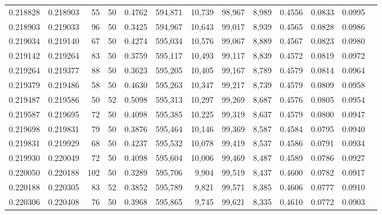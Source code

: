 \begin{tabular}{rrrrrrrrrrrrr}
0.218828 & 0.218903 &    55 &  50 &                                     0.4762 & 594,871 &  10,739 &  98,967 &   8,989 & 0.4556 & 0.0833 & 0.0995 \\
0.218903 & 0.219033 &    96 &  50 &                                     0.3425 & 594,967 &  10,643 &  99,017 &   8,939 & 0.4565 & 0.0828 & 0.0986 \\
0.219034 & 0.219140 &    67 &  50 &                                     0.4274 & 595,034 &  10,576 &  99,067 &   8,889 & 0.4567 & 0.0823 & 0.0980 \\
0.219142 & 0.219264 &    83 &  50 &                                     0.3759 & 595,117 &  10,493 &  99,117 &   8,839 & 0.4572 & 0.0819 & 0.0972 \\
0.219264 & 0.219377 &    88 &  50 &                                     0.3623 & 595,205 &  10,405 &  99,167 &   8,789 & 0.4579 & 0.0814 & 0.0964 \\
0.219379 & 0.219486 &    58 &  50 &                                     0.4630 & 595,263 &  10,347 &  99,217 &   8,739 & 0.4579 & 0.0809 & 0.0958 \\
0.219487 & 0.219586 &    50 &  52 &                                     0.5098 & 595,313 &  10,297 &  99,269 &   8,687 & 0.4576 & 0.0805 & 0.0954 \\
0.219587 & 0.219695 &    72 &  50 &                                     0.4098 & 595,385 &  10,225 &  99,319 &   8,637 & 0.4579 & 0.0800 & 0.0947 \\
0.219698 & 0.219831 &    79 &  50 &                                     0.3876 & 595,464 &  10,146 &  99,369 &   8,587 & 0.4584 & 0.0795 & 0.0940 \\
0.219831 & 0.219929 &    68 &  50 &                                     0.4237 & 595,532 &  10,078 &  99,419 &   8,537 & 0.4586 & 0.0791 & 0.0934 \\
0.219930 & 0.220049 &    72 &  50 &                                     0.4098 & 595,604 &  10,006 &  99,469 &   8,487 & 0.4589 & 0.0786 & 0.0927 \\
0.220050 & 0.220188 &   102 &  50 &                                     0.3289 & 595,706 &   9,904 &  99,519 &   8,437 & 0.4600 & 0.0782 & 0.0917 \\
0.220188 & 0.220305 &    83 &  52 &                                     0.3852 & 595,789 &   9,821 &  99,571 &   8,385 & 0.4606 & 0.0777 & 0.0910 \\
0.220306 & 0.220408 &    76 &  50 &                                     0.3968 & 595,865 &   9,745 &  99,621 &   8,335 & 0.4610 & 0.0772 & 0.0903 \\

\end{tabular}
